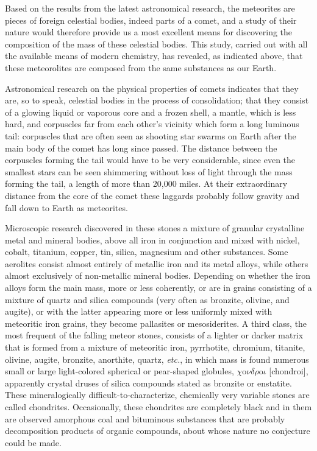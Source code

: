 \documentclass[a4paper, 12pt, oneside]{article}
\begin{document}
Based on the results from the latest astronomical research, the meteorites are pieces of foreign celestial bodies, indeed parts of a comet, and a study of their nature would therefore provide us a most excellent means for discovering the composition of the mass of these celestial bodies. This study, carried out with all the available means of modern chemistry, has revealed, as indicated above, that these meteorolites are composed from the same substances as our Earth.

Astronomical research on the physical properties of comets indicates that they are, so to speak, celestial bodies in the process of consolidation; that they consist of a glowing liquid or vaporous core and a frozen shell, a mantle, which is less hard, and corpuscles far from each other's vicinity which form a long luminous tail: corpuscles that are often seen as shooting star swarms on Earth after the main body of the comet has long since passed. The distance between the corpuscles forming the tail would have to be very considerable, since even the smallest stars can be seen shimmering without loss of light through the mass forming the tail, a length of more than 20,000 miles. At their extraordinary distance from the core of the comet these laggards probably follow gravity and fall down to Earth as meteorites.

Microscopic research discovered in these stones a mixture of granular crystalline metal and mineral bodies, above all iron in conjunction and mixed with nickel, cobalt, titanium, copper, tin, silica, magnesium and other substances. Some aerolites consist almost entirely of metallic iron and its metal alloys, while others almost exclusively of non-metallic mineral bodies. Depending on whether the iron alloys form the main mass, more or less coherently, or are in grains consisting of a mixture of quartz and silica compounds (very often as bronzite, olivine, and augite), or with the latter appearing more or less uniformly mixed with meteoritic iron grains, they become pallasites or mesosiderites. A third class, the most frequent of the falling meteor stones, consists of a lighter or darker matrix that is formed from a mixture of meteoritic iron, pyrrhotite, chromium, titanite, olivine, augite, bronzite, anorthite, quartz, \emph{etc.}, in which mass is found numerous small or large light-colored spherical or pear-shaped globules, $\chi$o$\nu\delta\rho$o$\iota$ [chondroi], apparently crystal druses of silica compounds stated as bronzite or enstatite. These mineralogically difficult-to-characterize, chemically very variable stones are called chondrites. Occasionally, these chondrites are completely black and in them are observed amorphous coal and bituminous substances that are probably decomposition products of organic compounds, about whose nature no conjecture could be made.
\end{document}
